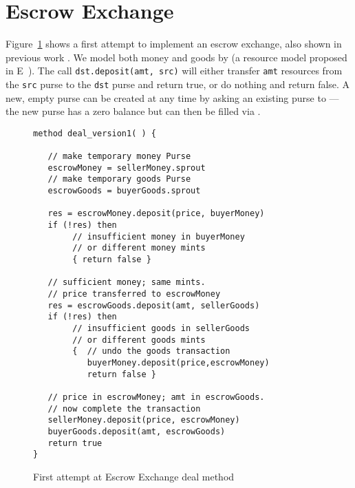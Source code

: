 \section{Escrow Exchange }
\label{section:example}

Figure~\ref{fig:DealV1} shows a first attempt to implement an escrow
exchange, also shown in previous work \cite{miller-esop2013,capeFTfJP14}.
%
%
We model both money and goods by  (a resource model
proposed in E~\cite{ELang}).  The call
%
\lstinline+dst.deposit(amt, src)+
%
will either transfer \lstinline+amt+ resources from the \lstinline+src+
purse to the \lstinline+dst+ purse and return true, or do nothing and
return false.  A new, empty purse can be created at any time by asking
an existing purse to  --- the new purse has a zero balance
but can then be filled via .

\begin{figure}[htb]
\begin{lstlisting}
method deal_version1( ) {

   // make temporary money Purse
   escrowMoney = sellerMoney.sprout
   // make temporary goods Purse
   escrowGoods = buyerGoods.sprout

   res = escrowMoney.deposit(price, buyerMoney)
   if (!res) then
        // insufficient money in buyerMoney
        // or different money mints
        { return false }

   // sufficient money; same mints.
   // price transferred to escrowMoney
   res = escrowGoods.deposit(amt, sellerGoods)
   if (!res) then
        // insufficient goods in sellerGoods
        // or different goods mints
        {  // undo the goods transaction
           buyerMoney.deposit(price,escrowMoney)
           return false }

   // price in escrowMoney; amt in escrowGoods.
   // now complete the transaction
   sellerMoney.deposit(price, escrowMoney)
   buyerGoods.deposit(amt, escrowGoods)
   return true
}
\end{lstlisting}
\vspace*{-7mm}
\caption{First attempt at Escrow Exchange deal method}
\label{fig:DealV1}
\end{figure}

